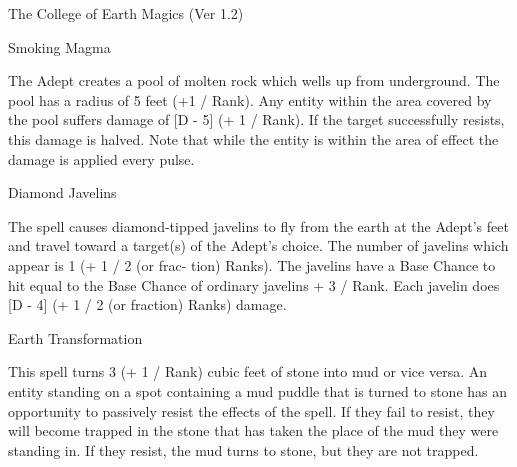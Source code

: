 \begin{Chapter}{The College of Earth Magics (Ver 1.2)}
\begin{spell}[S-17]{Smoking Magma }

\begin{effects}
The Adept creates a pool of molten rock which wells up from
underground.  The pool has a radius of 5 feet (+1 / Rank).  Any entity
within the area covered by the pool suffers damage of [D - 5] (+ 1 /
Rank).  If the target successfully resists, this damage is halved.
Note that while the entity is within the area of effect the damage is
applied every pulse.

\end{effects}
\end{spell}

\begin{spell}[S-18]{Diamond Javelins }

\begin{effects}
The spell causes diamond-tipped javelins to fly from the earth at the
Adept’s feet and travel toward a target(s) of the Adept’s choice. The
number of javelins which appear is 1 (+ 1 / 2 (or frac- tion) Ranks).
The javelins have a Base Chance to hit equal to the Base Chance of
ordinary javelins + 3 / Rank.  Each javelin does [D - 4] (+ 1 / 2 (or
fraction) Ranks) damage.

\end{effects}
\end{spell}

\begin{spell}[S-19]{Earth Transformation }

\begin{effects}
This spell turns 3 (+ 1 / Rank) cubic feet of stone into mud or vice
versa. An entity standing on a spot containing a mud puddle that is
turned to stone has an opportunity to passively resist the effects of
the spell.  If they fail to resist, they will become trapped in the
stone that has taken the place of the mud they were standing in.  If
they resist, the mud turns to stone, but they are not trapped.
\end{effects}
\end{spell}


\end{Chapter}
